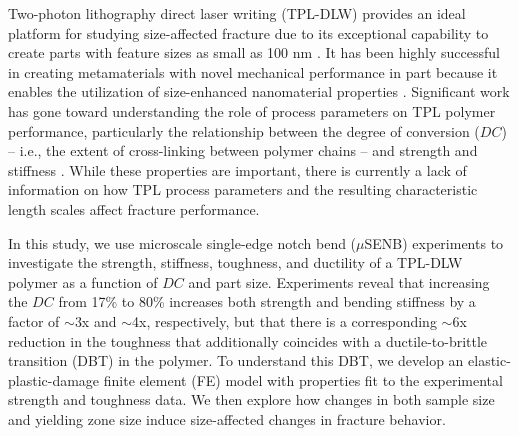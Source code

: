 \documentclass[11pt]{article}
\providecommand{\DC}[0]{$DC$}
\begin{document}
        Two-photon lithography direct laser writing (TPL-DLW) provides an ideal platform for studying size-affected fracture due to its exceptional capability to create parts with feature sizes as small as 100 nm \cite{maruo1997three, lee2008advances}.
        It has been highly successful in creating metamaterials with novel mechanical performance in part because it enables the utilization of size-enhanced nanomaterial properties \cite{meza2014strong, bauer2016approaching, bauer2017nanolattices, xia2022responsive}.
        Significant work has gone toward understanding the role of process parameters on TPL polymer performance, particularly the relationship between the degree of conversion (\DC{}) -- i.e., the extent of cross-linking between polymer chains -- and strength and stiffness \cite{bauer2019programmable, bauer2020thermal}.
        While these properties are important, there is currently a lack of information on how TPL process parameters and the resulting characteristic length scales affect fracture performance.

        In this study, we use microscale single-edge notch bend ($\mu$SENB) experiments to investigate the strength, stiffness, toughness, and ductility of a TPL-DLW polymer as a function of \DC{} and part size.
        Experiments reveal that increasing the \DC{} from 17\% to 80\% increases both strength and bending stiffness by a factor of $\sim$3x and $\sim$4x, respectively, but that there is a corresponding $\sim$6x reduction in the toughness that additionally coincides with a ductile-to-brittle transition (DBT) in the polymer.
        To understand this DBT, we develop an elastic-plastic-damage finite element (FE) model with properties fit to the experimental strength and toughness data.
        We then explore how changes in both sample size and yielding zone size induce size-affected changes in fracture behavior.
        
\end{document}
